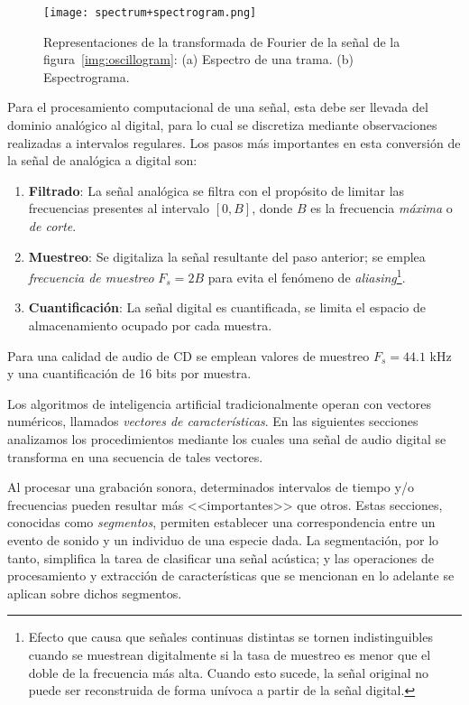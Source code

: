 \begin{figure}[!h]
    \centering
    \texttt{[image: spectrum+spectrogram.png]}
    \caption{Representaciones de la transformada de Fourier de la señal de la figura~\ref{img:oscillogram}: (a) Espectro de una trama. (b) Espectrograma.}
    \label{img:spectrum+spectrogram}
\end{figure}

Para el procesamiento computacional de una señal, esta debe ser llevada del dominio analógico al digital, para lo cual se discretiza mediante observaciones realizadas a intervalos regulares.
Los pasos más importantes en esta conversión de la señal de analógica a digital son:

\begin{enumerate}
    \item \textbf{Filtrado}: La señal analógica se filtra con el propósito de limitar las frecuencias presentes al intervalo $[0,B]$, donde $B$ es la frecuencia \textit{máxima} o \textit{de corte}.
    \item \textbf{Muestreo}: Se digitaliza la señal resultante del paso anterior;
    se emplea \textit{frecuencia de muestreo} $F_s = 2B$ para evita el fenómeno de \textit{aliasing}\footnote{Efecto que causa que señales continuas distintas se tornen indistinguibles cuando se muestrean digitalmente si la tasa de muestreo es menor que el doble de la frecuencia más alta.
    Cuando esto sucede, la señal original no puede ser reconstruida de forma unívoca a partir de la señal digital.}.
    \item \textbf{Cuantificación}: La señal digital es cuantificada, se limita el espacio de almacenamiento ocupado por cada muestra.
\end{enumerate}

Para una calidad de audio de CD se emplean valores de muestreo $F_s = 44.1$ kHz y una cuantificación de 16 bits por muestra.

Los algoritmos de inteligencia artificial tradicionalmente operan con vectores numéricos, llamados \textit{vectores de características}.
En las siguientes secciones analizamos los procedimientos mediante los cuales una señal de audio digital se transforma en una secuencia de tales vectores.

Al procesar una grabación sonora, determinados intervalos de tiempo y/o frecuencias pueden resultar más <<importantes>> que otros.
Estas secciones, conocidas como \textit{segmentos}, permiten establecer una correspondencia entre un evento de sonido y un individuo de una especie dada.
La segmentación, por lo tanto, simplifica la tarea de clasificar una señal acústica;
y las operaciones de procesamiento y extracción de características que se mencionan en lo adelante se aplican sobre dichos segmentos.

